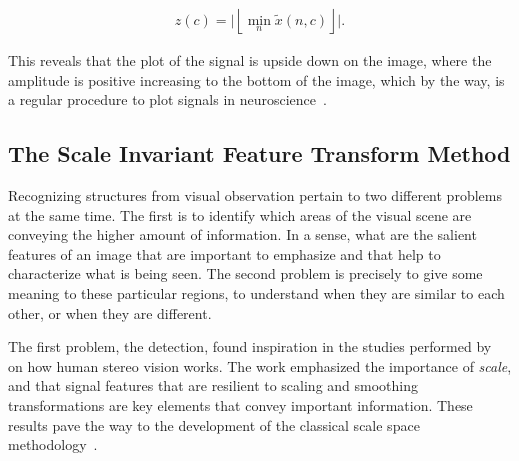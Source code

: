 \documentclass[review]{elsarticle}
\begin{document}
\begin{align*}
z(c) =\Big | \left \lfloor{ \min_{n} \tilde{x}(n,c) }\right \rfloor \Big |.
\label{eq:zerolevel}
\end{align*}

This reveals that the plot of the signal is upside down on the image, where the amplitude is positive increasing to the bottom of the image, which by the way, is a regular procedure to plot signals in neuroscience~\cite{Schomer2010}.






\subsection{The Scale Invariant Feature Transform Method}
\label{SIFT}


Recognizing structures from visual observation pertain to two different problems at the same time.  The first is to identify which areas of the visual scene are conveying the higher amount of information.  In a sense, what are the salient features of an image that are important to emphasize and that help to characterize what is being seen.   The second problem is precisely to give some meaning to these particular regions, to understand when they are similar to each other, or when they are different.

The first problem, the detection, found inspiration in the studies performed by~ \citep{Marr1979} on how human stereo vision works.  The work \citep{Iijima1962,Witkin1983} emphasized the importance of \textit{scale}, and that signal features that are resilient to scaling and smoothing transformations are key elements that convey important information.  These results pave the way to the development of the classical scale space methodology~\cite{Koenderink1984,Weickert1999,Lindeberg1990,Lindeberg1994,ter1997scale,Jansson2020}.
\end{document}
